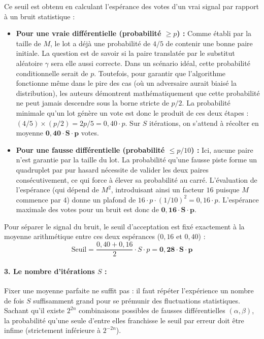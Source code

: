 \documentclass[a4paper,11pt]{article}
\begin{document}
Ce seuil est obtenu en calculant l'espérance des votes d'un vrai signal par rapport à un bruit statistique :
\begin{itemize}
    \item \textbf{Pour une vraie différentielle (probabilité $\ge p$) :} Comme établi par la taille de $M$, le lot a déjà une probabilité de $4/5$ de contenir une bonne paire initiale. La question est de savoir si la paire translatée par le substitut aléatoire $\gamma$ sera elle aussi correcte. Dans un scénario idéal, cette probabilité conditionnelle serait de $p$. Toutefois, pour garantir que l'algorithme fonctionne même dans le pire des cas (où un adversaire aurait biaisé la distribution), les auteurs démontrent mathématiquement que cette probabilité ne peut jamais descendre sous la borne stricte de $p/2$. La probabilité minimale qu'un lot génère un vote est donc le produit de ces deux étapes : $(4/5) \times (p/2) = 2p/5 = 0,40 \cdot p$. Sur $S$ itérations, on s'attend à récolter en moyenne $\mathbf{0,40 \cdot S \cdot p}$ votes.
    \item \textbf{Pour une fausse différentielle (probabilité $\le p/10$) :} Ici, aucune paire n'est garantie par la taille du lot. La probabilité qu'une fausse piste forme un quadruplet par pur hasard nécessite de valider les deux paires consécutivement, ce qui force à élever sa probabilité au carré. L'évaluation de l'espérance (qui dépend de $M^2$, introduisant ainsi un facteur $16$ puisque $M$ commence par $4$) donne un plafond de $16 \cdot p \cdot (1/10)^2 = 0,16 \cdot p$. L'espérance maximale des votes pour un bruit est donc de $\mathbf{0,16 \cdot S \cdot p}$.
\end{itemize}
Pour séparer le signal du bruit, le seuil d'acceptation est fixé exactement à la moyenne arithmétique entre ces deux espérances ($0,16$ et $0,40$) :
\begin{equation*}
    \text{Seuil} = \frac{0,40 + 0,16}{2} \cdot S \cdot p = \mathbf{0,28 \cdot S \cdot p}
\end{equation*}

\paragraph{3. Le nombre d'itérations $S$ :}
Fixer une moyenne parfaite ne suffit pas : il faut répéter l'expérience un nombre de fois $S$ suffisamment grand pour se prémunir des fluctuations statistiques. Sachant qu'il existe $2^{2n}$ combinaisons possibles de fausses différentielles $(\alpha, \beta)$, la probabilité qu'une seule d'entre elles franchisse le seuil par erreur doit être infime (strictement inférieure à $2^{-2n}$). 
\end{document}

